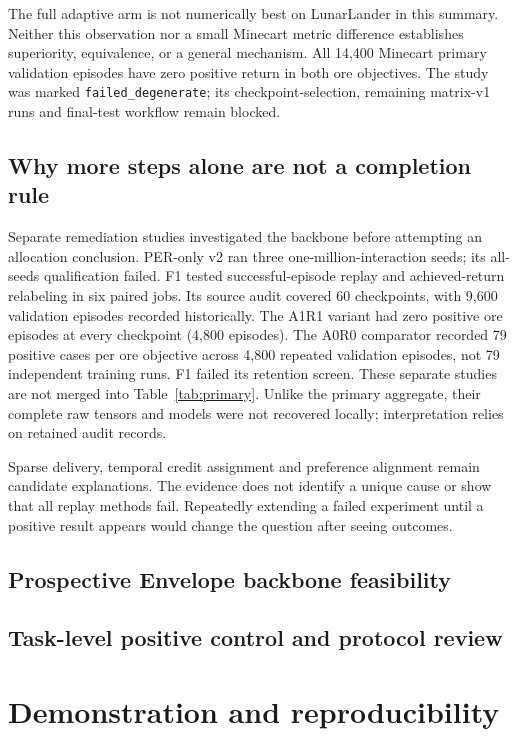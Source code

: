 The full adaptive arm is not numerically best on LunarLander in this summary.
Neither this observation nor a small Minecart metric difference establishes
superiority, equivalence, or a general mechanism. All 14,400 Minecart primary
validation episodes have zero positive return in both ore objectives. The
study was marked \texttt{failed\_degenerate}; its checkpoint-selection,
remaining matrix-v1 runs and final-test workflow remain blocked.

\subsection{Why more steps alone are not a completion rule}
Separate remediation studies investigated the backbone before attempting an
allocation conclusion. PER-only v2 ran three one-million-interaction seeds;
its all-seeds qualification failed. F1 tested successful-episode replay and
achieved-return relabeling in six paired jobs. Its source audit covered 60
checkpoints, with 9,600 validation episodes recorded historically. The A1R1
variant had zero positive ore episodes at every checkpoint (4,800 episodes).
The A0R0 comparator recorded 79 positive cases per ore objective across 4,800
repeated validation episodes, not 79 independent training runs. F1 failed its
retention screen. These separate studies are not merged into Table~\ref{tab:primary}.
Unlike the primary aggregate, their complete raw tensors and models were not
recovered locally; interpretation relies on retained audit records.

Sparse delivery, temporal credit assignment and preference alignment remain
candidate explanations. The evidence does not identify a unique cause or show
that all replay methods fail. Repeatedly extending a failed experiment until
a positive result appears would change the question after seeing outcomes.

\subsection{Prospective Envelope backbone feasibility}


\subsection{Task-level positive control and protocol review}




\section{Demonstration and reproducibility}
